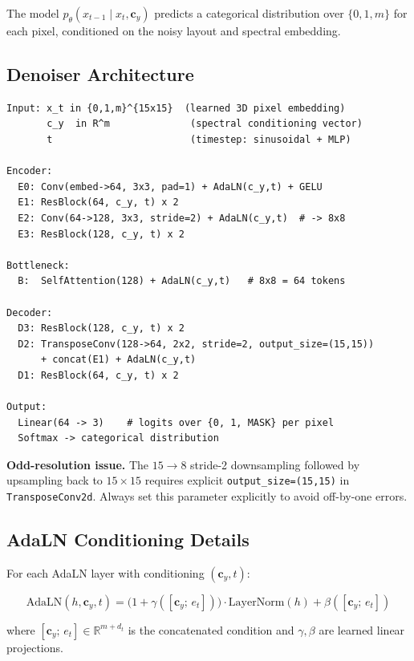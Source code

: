 \documentclass[12pt,a4paper]{article}
\newcommand{\cy}{\mathbf{c}_y}
\newcommand{\NOTE}[1]{\begin{tcolorbox}[notebox]#1\end{tcolorbox}}
\theoremstyle{definition}
\theoremstyle{plain}
\theoremstyle{remark}
\begin{document}
The model $p_\theta(x_{t-1} \mid x_t, \cy)$ predicts a categorical distribution over
$\{0, 1, m\}$ for each pixel, conditioned on the noisy layout and spectral embedding.

\subsection{Denoiser Architecture}

\begin{lstlisting}[caption={Topology-Aware U-Net with spectral conditioning.}]
Input: x_t in {0,1,m}^{15x15}  (learned 3D pixel embedding)
       c_y  in R^m              (spectral conditioning vector)
       t                        (timestep: sinusoidal + MLP)

Encoder:
  E0: Conv(embed->64, 3x3, pad=1) + AdaLN(c_y,t) + GELU
  E1: ResBlock(64, c_y, t) x 2
  E2: Conv(64->128, 3x3, stride=2) + AdaLN(c_y,t)  # -> 8x8
  E3: ResBlock(128, c_y, t) x 2

Bottleneck:
  B:  SelfAttention(128) + AdaLN(c_y,t)   # 8x8 = 64 tokens

Decoder:
  D3: ResBlock(128, c_y, t) x 2
  D2: TransposeConv(128->64, 2x2, stride=2, output_size=(15,15))
      + concat(E1) + AdaLN(c_y,t)
  D1: ResBlock(64, c_y, t) x 2

Output:
  Linear(64 -> 3)    # logits over {0, 1, MASK} per pixel
  Softmax -> categorical distribution
\end{lstlisting}

\NOTE{\textbf{Odd-resolution issue.}
The $15 \to 8$ stride-2 downsampling followed by upsampling back to $15\times15$
requires explicit \texttt{output\_size=(15,15)} in \texttt{TransposeConv2d}.
Always set this parameter explicitly to avoid off-by-one errors.}

\subsection{AdaLN Conditioning Details}

For each AdaLN layer with conditioning $(\cy, t)$:

\begin{equation}
  \mathrm{AdaLN}(h, \cy, t)
  = \bigl(1 + \gamma([\cy;\, e_t])\bigr)
    \cdot \mathrm{LayerNorm}(h)
    + \beta([\cy;\, e_t])
  \label{eq:adaLN2}
\end{equation}

where $[\cy;\, e_t] \in \mathbb{R}^{m + d_t}$ is the concatenated condition and
$\gamma, \beta$ are learned linear projections.
\end{document}
